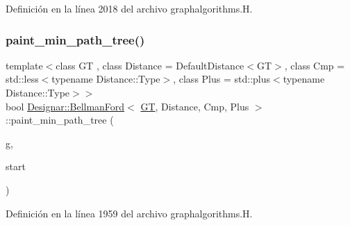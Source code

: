 Definición en la línea 2018 del archivo graphalgorithms.\+H.

\mbox{\label{class_designar_1_1_bellman_ford_a227581a852b2e97be90ac75d1aa8ad5d}} 
\subsubsection{\texorpdfstring{paint\+\_\+min\+\_\+path\+\_\+tree()}{paint\_min\_path\_tree()}}
{\footnotesize\ttfamily template$<$class GT , class Distance  = Default\+Distance$<$\+G\+T$>$, class Cmp  = std\+::less$<$typename Distance\+::\+Type$>$, class Plus  = std\+::plus$<$typename Distance\+::\+Type$>$$>$ \\
bool \hyperlink{class_designar_1_1_bellman_ford}{Designar\+::\+Bellman\+Ford}$<$ \hyperlink{demo-buildgraph_8_c_a3001c40d2c31ca87ed96cd7d1334a55e}{GT}, Distance, Cmp, Plus $>$\+::paint\+\_\+min\+\_\+path\+\_\+tree (\begin{DoxyParamCaption}\item[{\hyperlink{demo-buildgraph_8_c_a3001c40d2c31ca87ed96cd7d1334a55e}{GT} \&}]{g,  }\item[{Node \&}]{start }\end{DoxyParamCaption})\hspace{0.3cm}{\ttfamily [inline]}}



Definición en la línea 1959 del archivo graphalgorithms.\+H.

\mbox{\label{class_designar_1_1_bellman_ford_a2363c1e87c7e5ca8778a786db99fcff5}} 
